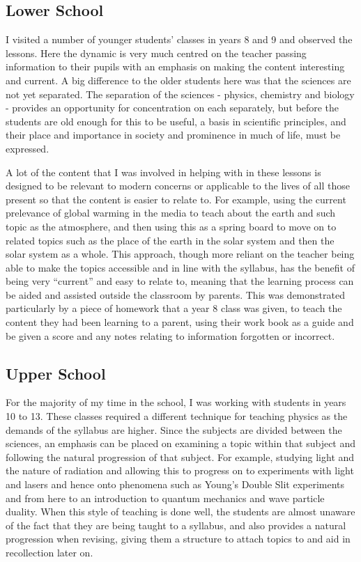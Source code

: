 	\subsection{Lower School} %
	\label{sub:lower_school}
		I visited a number of younger students' classes in years 8 and 9 and observed the lessons. Here the dynamic is very much centred on the teacher passing information to their pupils with an emphasis on making the content interesting and current. A big difference to the older students here was that the sciences are not yet separated. The separation of the sciences - physics, chemistry and biology - provides an opportunity for concentration on each separately, but before the students are old enough for this to be useful, a basis in scientific principles, and their place and importance in society and prominence in much of life, must be expressed.

		A lot of the content that I was involved in helping with in these lessons is designed to be relevant to modern concerns or applicable to the lives of all those present so that the content is easier to relate to. For example, using the current prelevance of global warming in the media to teach about the earth and such topic as the atmosphere, and then using this as a spring board to move on to related topics such as the place of the earth in the solar system and then the solar system as a whole. This approach, though more reliant on the teacher being able to make the topics accessible and in line with the syllabus, has the benefit of being very ``current'' and easy to relate to, meaning that the learning process can be aided and assisted outside the classroom by parents. This was demonstrated particularly by a piece of homework that a year 8 class was given, to teach the content they had been learning to a parent, using their work book as a guide and be given a score and any notes relating to information forgotten or incorrect.


	\subsection{Upper School} %
	\label{sub:upper_school}
		For the majority of my time in the school, I was working with students in years 10 to 13. These classes required a different technique for teaching physics as the demands of the syllabus are higher. Since the subjects are divided between the sciences, an emphasis can be placed on examining a topic within that subject and following the natural progression of that subject. For example, studying light and the nature of radiation and allowing this to progress on to experiments with light and lasers and hence onto phenomena such as Young's Double Slit experiments and from here to an introduction to quantum mechanics and wave particle duality. When this style of teaching is done well, the students are almost unaware of the fact that they are being taught to a syllabus, and also provides a natural progression when revising, giving them a structure to attach topics to and aid in recollection later on.


